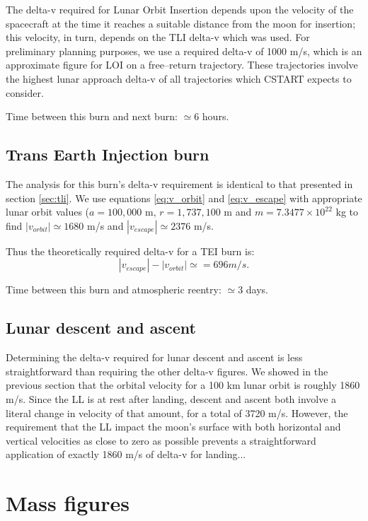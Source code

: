 \documentclass{report}
\begin{document}
The delta-v required for Lunar Orbit Insertion depends upon the velocity of the spacecraft at the time it reaches a suitable distance from the moon for insertion; this velocity, in turn, depends on the TLI delta-v which was used.  For preliminary planning purposes, we use a required delta-v of 1000 m/s, which is an approximate figure for LOI on a free--return trajectory.  These trajectories involve the highest lunar approach delta-v of all trajectories which CSTART expects to consider.

Time between this burn and next burn: $\simeq 6$ hours.

\subsection{Trans Earth Injection burn}

The analysis for this burn's delta-v requirement is identical to that presented in section \ref{sec:tli}.  We use equations \ref{eq:v_orbit} and \ref{eq:v_escape} with appropriate lunar orbit values ($a = 100,000$ m, $r = 1,737,100$ m and $m = 7.3477 \times 10^{22}$ kg to find $|v_{orbit}| \simeq 1680$ m/s and $|v_{escape}| \simeq 2376$ m/s.

Thus the theoretically required delta-v for a TEI burn is:
\begin{equation}
|v_{escape}| - |v_{orbit}| \simeq = 696 m/s.
\end{equation}

Time between this burn and atmospheric reentry: $\simeq 3$ days.

\subsection{Lunar descent and ascent}

Determining the delta-v required for lunar descent and ascent is less straightforward than requiring the other delta-v figures.  We showed in the previous section that the orbital velocity for a 100 km lunar orbit is roughly 1860 m/s.  Since the LL is at rest after landing, descent and ascent both involve a literal change in velocity of that amount, for a total of 3720 m/s.  However, the requirement that the LL impact the moon's surface with both horizontal and vertical velocities as close to zero as possible prevents a straightforward application of exactly 1860 m/s of delta-v for landing...

\section{Mass figures}
\end{document}
